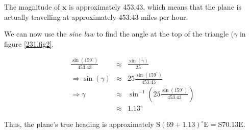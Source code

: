 The magnitude of $\mathbf{x}$ is approximately 453.43, which means that the plane is actually travelling at approximately 453.43 miles per hour.

We can now use the \emph{sine law} to find the angle at the top of the triangle ($\gamma$ in figure \vref{231.fig2}.

\begin{eqnarray*}
	\frac{\sin\left(159^\circ\right)}{453.43}&\approx&\frac{\sin\left(\gamma\right)}{25}\\
	\Rightarrow\sin\left(\gamma\right)&\approx&25\frac{\sin\left(159^\circ\right)}{453.43}\\
	\Rightarrow\gamma&\approx&\sin^{-1}\left(25\frac{\sin\left(159^\circ\right)}{453.43}\right)\\
	&\approx&1.13^\circ
\end{eqnarray*}

Thus, the plane's true heading is approximately $\mbox{S}\left(69+1.13\right)^\circ\mbox{E}=\mbox{S}70.13\mbox{E}$.

